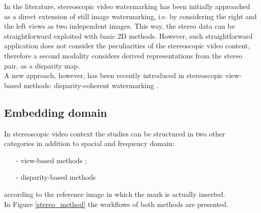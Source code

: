 In the literature, stereoscopic video watermarking has been initially approached as a direct extension of still image watermarking, i.e. by considering the right and the left views as two independent images. This way, the stereo data can be straightforward exploited with basic 2D methods. However, such straightforward application does not consider the peculiarities of the stereoscopic video content, therefore a second modality considers derived representations from the stereo pair, as a disparity map.\\ 
A new approach, however, has been recently introduced in stereoscopic view-based methods: disparity-coherent watermarking \cite{DOER}.

\subsection{Embedding domain}
In stereoscopic video context the studies can be structured in two other categories in addition to spacial and frequency domain:
\begin{itemize}
\item[-] view-based methods \cite{16,17,18,19,20,21};
\item[-] disparity-based methods \cite{22}
\end{itemize}
according to the reference image in which the mark is actually inserted.\\
In Figure \ref{stereo_method} the workflows of both methods are presented.
